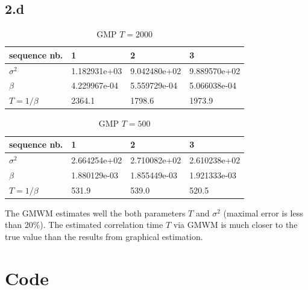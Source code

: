 \documentclass{article}
\begin{document}
\subsection*{2.d}

\begin{table}[h]
\centering
\begin{tabular}{llll}
sequence nb. & 1 & 2 & 3 \\ \hline
$\sigma^2$ & 1.182931e+03 & 9.042480e+02 & 9.889570e+02 \\
$\beta$ & 4.229967e-04 & 5.559729e-04 & 5.066038e-04 \\
$T=1/\beta$ & 2364.1 & 1798.6 & 1973.9
\end{tabular}
\caption{GMP $T=2000$}
\label{tab:fit_gmp2000}
\end{table}

\begin{table}[h]
\centering
\begin{tabular}{llll}
sequence nb. & 1 & 2 & 3 \\ \hline
$\sigma^2$ & 2.664254e+02 & 2.710082e+02 & 2.610238e+02 \\
$\beta$ & 1.880129e-03 & 1.855449e-03 & 1.921333e-03 \\
$T=1/\beta$ & 531.9 & 539.0 & 520.5
\end{tabular}
\caption{GMP $T=500$}
\label{tab:fit_gmp500}
\end{table}

The GMWM estimates well the both parameters $T$ and $\sigma^2$ (maximal error is less than 20\%).
The estimated correlation time $T$ via GMWM is much closer to the true value than the results from graphical estimation.

\newpage
\section*{Code}

\end{document}
